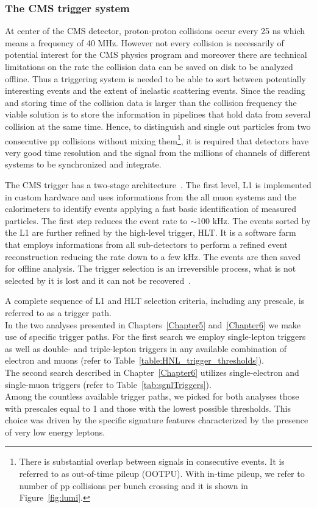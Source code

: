 \clearpage
\subsubsection{The CMS trigger system}\label{sec:triggersystem}

At center of the CMS detector, proton-proton collisions occur every
25 ns which means a frequency of 40 MHz. However not every collision is
necessarily of potential interest for the CMS physics program and
moreover there are technical limitations on the rate the collision data can be
saved on disk to be analyzed offline. Thus a triggering system is needed to be
able to sort between potentially interesting events and the extent of
inelastic scattering events.
Since the reading and storing time of the collision data is larger
than the collision frequency the viable solution is
to store the information in pipelines that hold data
from several collision at the same time.
Hence, to distinguish and single out particles from two consecutive pp collisions without
mixing them\footnote{There is substantial
overlap between signals in consecutive events. It is referred to as
out-of-time pileup (OOTPU). With in-time pileup, we refer to number of
pp collisions per bunch crossing and it is shown in
Figure~\ref{fig:lumi}.}, it is
required that detectors have very good time
resolution and the signal from the millions of channels of different
systems to be synchronized and integrate.

The CMS trigger has a two-stage architecture~\cite{Khachatryan_2017}. The first level, L1 is
implemented in custom hardware and uses informations from the 
all muon systems and the calorimeters to identify events applying a fast
basic identification of measured particles. The first step reduces the
event rate to $\sim$100 kHz. The events sorted by the L1 are further refined by the
high-level trigger, HLT. It is a software farm that employs informations from all sub-detectors to perform a
refined event reconstruction reducing the rate down to a few kHz. The 
events are then saved for offline analysis.
The trigger selection is an irreversible process, what is not selected
by it is lost and it can not be recovered~\cite{Khachatryan_2017}.

A complete sequence of L1
and HLT selection criteria, including any prescale, is referred to
as a trigger path.\\

In the two analyses presented in Chapters~\ref{Chapter5}
and~\ref{Chapter6} we make use of specific trigger paths. For the
first search we employ single-lepton triggers as well as double- and
triple-lepton triggers in any available combination of electron and
muons (refer to Table~\ref{table:HNL_trigger_thresholds}).\\
The second search described in Chapter~\ref{Chapter6} utilizes
single-electron and single-muon triggers (refer to
Table~\ref{tab:sgnlTriggers}).\\
Among the countless available trigger paths, we picked for both
analyses those with prescales equal to 1 and those with the
lowest possible \pt thresholds. This choice was driven by the specific
signature features characterized by the presence of very low energy leptons.

